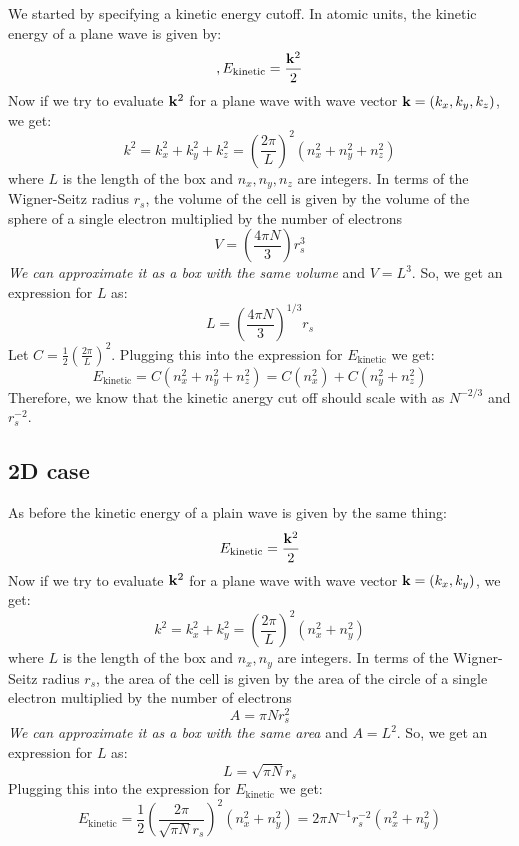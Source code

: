 \documentclass[12pt]{article}
\begin{document}
We started by specifying a kinetic energy cutoff. In atomic units, the kinetic energy of a plane wave is given by:
\begin{equation},
    E_{\text{kinetic}} = \frac{\vb{k}^2}{2}
\end{equation}
Now if we try to evaluate $\vb{k}^2$ for a plane wave with wave vector $\vb{k} = (k_x, k_y, k_z)$, we get:
\begin{equation}
    k^2 = k_x^2 + k_y^2 + k_z^2 =  \left(\frac{2\pi}{L}\right)^2 \left(n_x^2 + n_y^2 + n_z^2\right)
\end{equation}
where \( L \) is the length of the box and \( n_x, n_y, n_z \) are integers. In terms of the Wigner-Seitz radius \( r_s \), the volume of the cell is given by the volume of the sphere of a single electron multiplied by the number of electrons
\begin{equation}
    V = \left(\frac{4\pi N}{3}\right) r_s^3
\end{equation}
\emph{We can approximate it as a box with the same volume} and \( V= L^3 \). So, we get an expression for \( L \) as:
\begin{equation}
    L = \left( \frac{4\pi N}{3} \right)^{1/3} r_s
\end{equation}
Let $C = \frac{1}{2}\left(\frac{2 \pi}{L}\right)^2$.
Plugging this into the expression for $E_{\text{kinetic}}$ we get:
\begin{equation}
    E_{\text{kinetic}} = C \left(n_x^2 + n_y^2 + n_z^2\right) = C \left(n_x^2\right) + C \left(n_y^2 + n_z^2\right)
\end{equation}
Therefore, we know that the kinetic anergy cut off should scale with as $N^{-2/3}$ and $r_s^{-2}$.
\subsection{2D case}
As before the kinetic energy of a plain wave is given by the same thing:
\begin{equation}
    E_{\text{kinetic}} = \frac{\vb{k}^2}{2}
\end{equation}
Now if we try to evaluate $\vb{k}^2$ for a plane wave with wave vector $\vb{k} = (k_x, k_y)$, we get:
\begin{equation}
    k^2 = k_x^2 + k_y^2 =  \left(\frac{2\pi}{L}\right)^2 \left(n_x^2 + n_y^2\right)
\end{equation}
where $L$ is the length of the box and $n_x, n_y$ are integers. In terms of the Wigner-Seitz radius $r_s$, the area of the cell is given by the area of the circle of a single electron multiplied by the number of electrons
\begin{equation}
    A = \pi N r_s^2
\end{equation}
\emph{We can approximate it as a box with the same area} and $A= L^2$. So, we get an expression for $L$ as:
\begin{equation}
    L = \sqrt{\pi N} r_s
\end{equation}
Plugging this into the expression for $E_{\text{kinetic}}$ we get:
\begin{equation}
    E_{\text{kinetic}} = \frac{1}{2}\left(\frac{2 \pi}{\sqrt{\pi N} r_s}\right)^2 \left(n_x^2 + n_y^2\right) = 2\pi N^{-1} r_s^{-2} \left(n_x^2 + n_y^2\right)
\end{equation}
\end{document}
